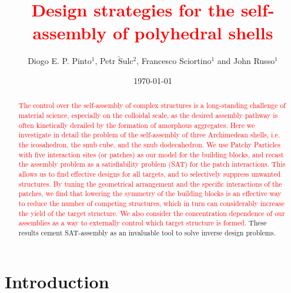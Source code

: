 \documentclass[a4paper, amsfonts, amssymb, amsmath, reprint, showkeys, nofootinbib, twoside]{revtex4-1}
\begin{document}
\title{\textcolor{red}{Design strategies for the self-assembly of polyhedral shells}}

\author{Diogo E. P. Pinto$^1$, Petr $\check{\text{S}}$ulc$^2$, Francesco Sciortino$^1$ and John Russo$^1$}

\date{\today} %

\begin{abstract}
\textcolor{red}{The control over the self-assembly of complex structures is a long-standing challenge of material science, especially on the colloidal scale, as the desired assembly pathway is often kinetically derailed by the formation of amorphous aggregates. Here we investigate in detail the problem of the self-assembly of
three Archimedean shells,
i.e. the icosahedron, the snub cube, and the snub dodecahedron. We use Patchy Particles with five interaction sites (or patches) as our model for the building blocks, and recast the assembly problem as a satisfiability problem (SAT) for the patch interactions. This allows us to find effective designs for all targets, and to selectively suppress unwanted structures.
By tuning the geometrical arrangement and the specific interactions of the patches, we find 
that lowering the symmetry of the building blocks is an effective way to reduce the number of competing structures, which in turn can considerably increase the yield of the target structure. We also consider the concentration dependence of our assemblies as a way to externally control which target structure is formed.} These results cement SAT-assembly as an invaluable tool to solve inverse design problems.
\end{abstract}

\maketitle

\section{Introduction}
\end{document}
